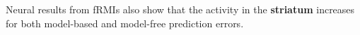 \begin{casestudy}

    Neural results from fRMIs also show that the activity in the \textbf{striatum} increases for both model-based and model-free prediction errors.
\end{casestudy}
